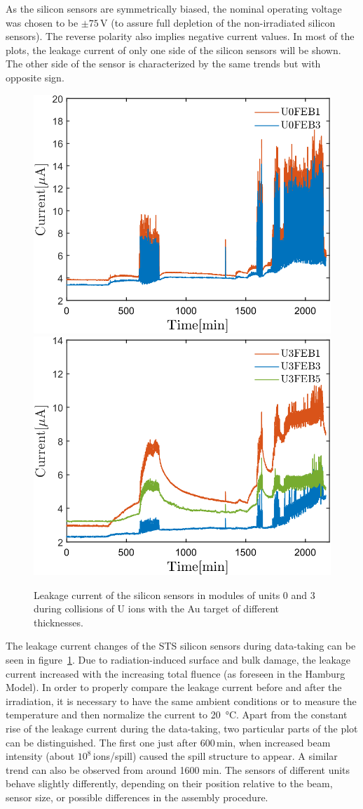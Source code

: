 As the silicon sensors are symmetrically biased, the nominal operating voltage was chosen to be $\pm75$\,V (to assure full depletion of the non-irradiated silicon sensors). The reverse polarity also implies negative current values. In most of the plots, the leakage current of only one side of the silicon sensors will be shown. The other side of the sensor is characterized by the same trends but with opposite sign.

\begin{figure}[!h]
\centering
\includegraphics[width=0.45\columnwidth]{Chapter6/DCS/images/uranium/U0.png}
\includegraphics[width=0.45\columnwidth]{Chapter6/DCS/images/uranium/U3.png}
\caption{Leakage current of the silicon sensors in modules of units $0$ and $3$ during collisions of U ions with the Au target of different thicknesses.}
\label{fig_msts_LC}
\end{figure}

The leakage current changes of the \gls{STS} silicon sensors during data-taking can be seen in figure~\ref{fig_msts_LC}. Due to radiation-induced surface and bulk damage, the leakage current  increased with the increasing total fluence (as foreseen in the Hamburg Model). In order to properly compare the leakage current before and after the irradiation, it is necessary to have the same ambient conditions or to measure the temperature and then normalize the current to \SI{20}{\celsius}. Apart from the constant rise of the leakage current during the data-taking, two particular parts of the plot can be distinguished. The first one just after $600$\,min, when increased beam intensity (about $10^{8}$\,ions/spill) caused the spill structure to appear. A similar trend can also be observed from around 1600 min. The sensors of different units behave slightly differently, depending on their position relative to the beam, sensor size, or possible differences in the assembly procedure.


